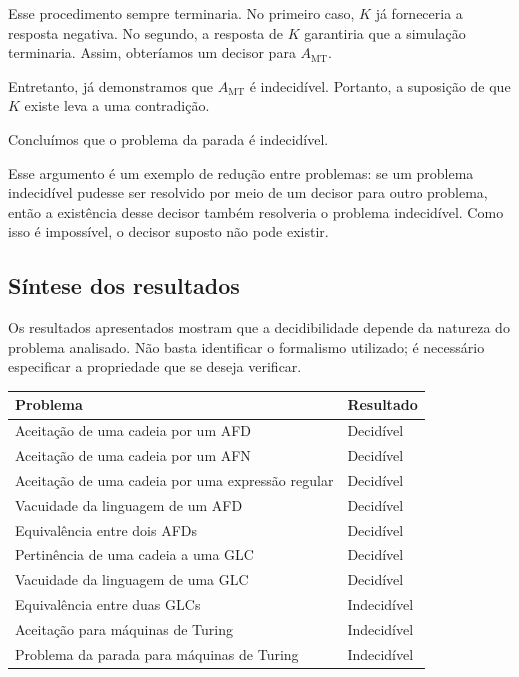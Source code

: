 \documentclass[
  brazilian,
  letterpaper,
]{book}
\theoremstyle{plain}
\theoremstyle{definition}
\theoremstyle{remark}
\begin{document}
Esse procedimento sempre terminaria. No primeiro caso, \(K\) já
forneceria a resposta negativa. No segundo, a resposta de \(K\)
garantiria que a simulação terminaria. Assim, obteríamos um decisor para
\(A_{\mathrm{MT}}\).

Entretanto, já demonstramos que \(A_{\mathrm{MT}}\) é indecidível.
Portanto, a suposição de que \(K\) existe leva a uma contradição.

Concluímos que o problema da parada é indecidível.

Esse argumento é um exemplo de redução entre problemas: se um problema
indecidível pudesse ser resolvido por meio de um decisor para outro
problema, então a existência desse decisor também resolveria o problema
indecidível. Como isso é impossível, o decisor suposto não pode existir.

\subsection{Síntese dos resultados}\label{suxedntese-dos-resultados}

Os resultados apresentados mostram que a decidibilidade depende da
natureza do problema analisado. Não basta identificar o formalismo
utilizado; é necessário especificar a propriedade que se deseja
verificar.

\begin{longtable*}[]{|l|l|}
\toprule\noalign{}
Problema & Resultado \\
\midrule\noalign{}
\endhead
\bottomrule\noalign{}
\endlastfoot
Aceitação de uma cadeia por um AFD & Decidível \\
\midrule
Aceitação de uma cadeia por um AFN & Decidível \\
\midrule
Aceitação de uma cadeia por uma expressão regular & Decidível \\
\midrule
Vacuidade da linguagem de um AFD & Decidível \\
\midrule
Equivalência entre dois AFDs & Decidível \\
\midrule
Pertinência de uma cadeia a uma GLC & Decidível \\
\midrule
Vacuidade da linguagem de uma GLC & Decidível \\
\midrule
Equivalência entre duas GLCs & Indecidível \\
\midrule
Aceitação para máquinas de Turing & Indecidível \\
\midrule
Problema da parada para máquinas de Turing & Indecidível \\
\end{longtable*}
\end{document}
